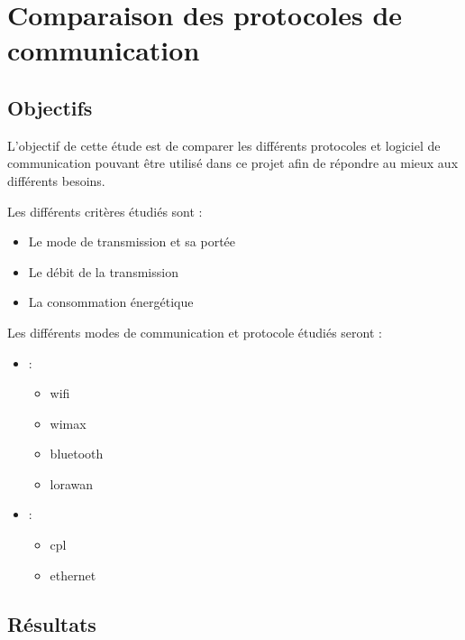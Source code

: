 \section{Comparaison des protocoles de communication}
\label{sec:comparaisonProtocoleCommnunication}

\subsection{Objectifs}
\label{sec:comparaisonProtocoleCommnunicationObjectifs}

L'objectif de cette étude est de comparer les différents protocoles et logiciel de communication
pouvant être utilisé dans ce projet afin de répondre au mieux aux différents besoins.\newline

Les différents critères étudiés sont :

\begin{itemize}
    \item Le mode de transmission et sa portée
    \item Le débit de la transmission
    \item La consommation énergétique
\end{itemize}

Les différents modes de communication et protocole étudiés seront :

\begin{itemize}
    \item {} :
          \begin{itemize}
              \item \Gls{wifi}
              \item \Gls{wimax}
              \item \Gls{bluetooth}
              \item \Gls{lorawan}
          \end{itemize}
    \item {} :
          \begin{itemize}
              \item \Gls{cpl}
              \item \Gls{ethernet}
          \end{itemize}
\end{itemize}

\subsection{Résultats}
\label{sec:comparaisonProtocoleCommnunicationResultats}

